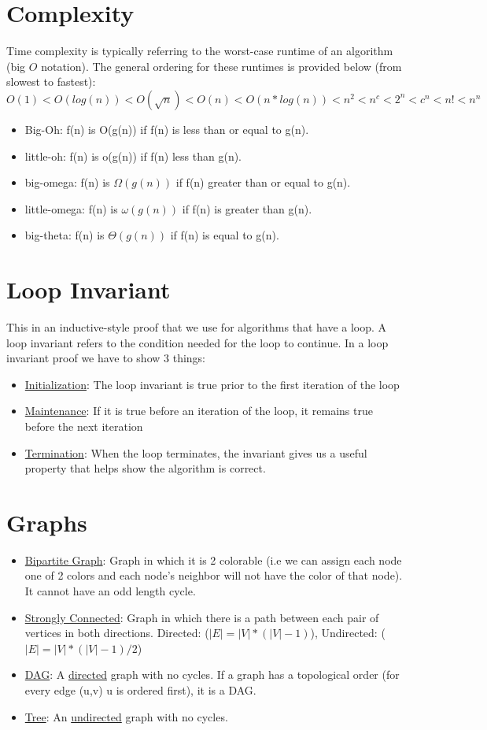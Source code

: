 \documentclass{article}
\begin{document}
\section{Complexity}
Time complexity is typically referring to the worst-case runtime of an algorithm (big $O$ notation). The general ordering for these runtimes is provided below (from slowest to fastest):
$O(1) < O(log(n)) < O(\sqrt{n}) < O(n) < O(n*log(n)) < n^2 < n^c < 2^n < c^n < n! < n^n$
\begin{itemize}
  \item Big-Oh: f(n) is O(g(n)) if f(n) is less than or equal to g(n).
  \item little-oh: f(n) is o(g(n)) if f(n) less than g(n).
  \item big-omega: f(n) is $\Omega (g(n))$ if f(n) greater than or equal to g(n).
  \item little-omega: f(n) is $\omega (g(n))$ if f(n) is greater than g(n).
  \item big-theta: f(n) is $\Theta (g(n))$ if f(n) is equal to g(n).
\end{itemize}

\section{Loop Invariant}
This in an inductive-style proof that we use for algorithms that have a loop. A loop invariant refers to the condition needed for the loop to continue. In a loop invariant proof we have to show 3 things:
\begin{itemize}
    \item \underline{Initialization}: The loop invariant is true prior to the first iteration of the loop
    \item \underline{Maintenance}: If it is true before an iteration of the loop, it remains true before the next iteration
    \item \underline{Termination}: When the loop terminates, the invariant gives us a useful property that helps show the algorithm is correct.
\end{itemize}

\section{Graphs}
\begin{itemize}
  \item \underline{Bipartite Graph}: Graph in which it is 2 colorable (i.e we can 
      assign each node one of 2 colors and each node's neighbor will not 
      have the color of that node). It cannot have an odd length cycle.
    \item \underline{Strongly Connected}: Graph in which there is a path between each 
      pair of vertices in both directions. Directed: ($|E| = |V|*(|V|-1)$), Undirected: ($|E| = |V|*(|V|-1)/2$)
    \item \underline{DAG}: A \underline{directed} graph with no cycles. If a graph has a topological order (for every
      edge (u,v) u is ordered first), it is a DAG.
    \item \underline{Tree}: An \underline{undirected} graph with no cycles. 
\end{itemize}
\end{document}
